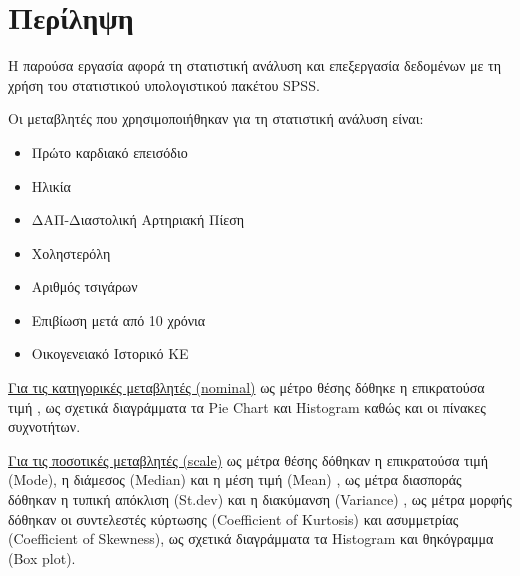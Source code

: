 \clearpage
\section*{Περίληψη}
Η παρούσα εργασία αφορά τη στατιστική ανάλυση και επεξεργασία δεδομένων με τη χρήση του στατιστικού υπολογιστικού πακέτου SPSS.

Οι μεταβλητές που χρησιμοποιήθηκαν για τη στατιστική ανάλυση είναι:
\begin{itemize}
  \item Πρώτο καρδιακό επεισόδιο 
  \item Ηλικία 
  \item ΔΑΠ-Διαστολική Αρτηριακή Πίεση 
  \item Χοληστερόλη 
  \item Αριθμός τσιγάρων 
  \item Επιβίωση μετά από 10 χρόνια 
  \item Οικογενειακό Ιστορικό ΚΕ 
\end{itemize}

\underline{Για τις κατηγορικές μεταβλητές (nominal)} ως μέτρο θέσης δόθηκε η επικρατούσα τιμή  , ως σχετικά διαγράμματα τα Pie Chart και Histogram καθώς και οι πίνακες συχνοτήτων.

\underline{Για τις ποσοτικές μεταβλητές (scale)} ως μέτρα θέσης δόθηκαν η επικρατούσα τιμή (Mode), η διάμεσος (Median) και η μέση τιμή (Mean) , ως μέτρα διασποράς δόθηκαν η τυπική απόκλιση (St.dev) και η διακύμανση (Variance) , ως μέτρα μορφής δόθηκαν οι συντελεστές κύρτωσης (Coefficient of Kurtosis) και ασυμμετρίας (Coefficient of Skewness), ως σχετικά διαγράμματα τα Histogram και θηκόγραμμα (Box plot).

